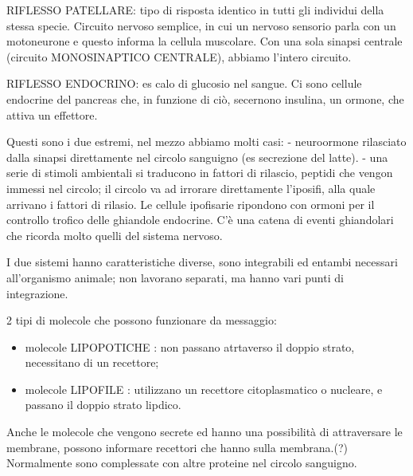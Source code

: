 \documentclass[a4paper,12pt]{article}
\begin{document}
RIFLESSO PATELLARE: tipo di risposta identico in tutti gli individui della stessa specie. Circuito nervoso semplice, in cui un nervoso sensorio parla con un motoneurone e questo informa la cellula muscolare. Con una sola sinapsi centrale (circuito MONOSINAPTICO CENTRALE), abbiamo l'intero circuito.

RIFLESSO ENDOCRINO: es calo di glucosio nel sangue. Ci sono cellule endocrine del pancreas che, in funzione di ciò, secernono insulina, un ormone, che attiva un effettore.

Questi sono i due estremi, nel mezzo abbiamo molti casi:
- neuroormone rilasciato dalla sinapsi direttamente nel circolo sanguigno (es secrezione del latte).
- una serie di stimoli ambientali si traducono in fattori di rilascio, peptidi che vengon immessi nel circolo; il circolo va ad irrorare direttamente l'iposifi, alla quale arrivano i fattori di rilasio. Le cellule ipofisarie ripondono con ormoni per il controllo trofico delle ghiandole endocrine. C'è una catena di eventi ghiandolari che ricorda molto quelli del sistema nervoso.

I due sistemi hanno caratteristiche diverse, sono integrabili ed entambi necessari all'organismo animale; non lavorano separati, ma hanno vari punti di integrazione.

2 tipi di molecole che possono funzionare da messaggio:
\begin{itemize}
    \item{molecole LIPOPOTICHE : non passano atrtaverso il doppio strato, necessitano di un recettore;}
    \item{molecole LIPOFILE : utilizzano un recettore citoplasmatico o nucleare, e passano il doppio strato lipdico.}
    \end{itemize}
Anche le molecole che vengono secrete ed hanno una possibilità di attraversare le membrane, possono informare recettori che hanno sulla membrana.(?) Normalmente sono complessate con altre proteine nel circolo sanguigno.
\end{document}

